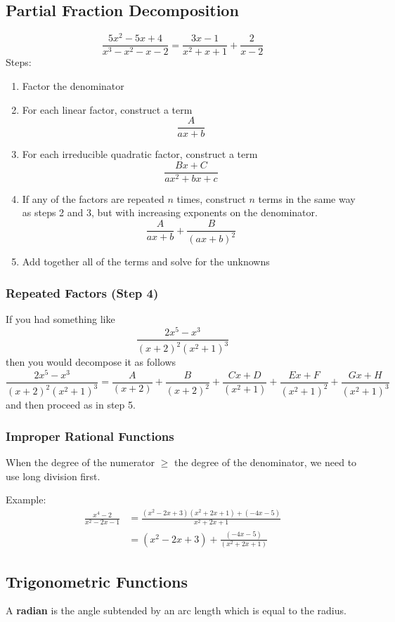 \documentclass[12pt]{article}
\begin{document}
\subsection*{Partial Fraction Decomposition}
\[ \frac{5x^2-5x+4}{x^3-x^2-x-2} = \frac{3x-1}{x^2+x+1} + \frac{2}{x-2} \]
Steps:
\begin{enumerate}
\item Factor the denominator
\item For each linear factor, construct a term \[ \frac{A}{ax+b} \]
\item For each irreducible quadratic factor, construct a term \[ \frac{Bx+C}{ax^2+bx+c} \]
\item If any of the factors are repeated $n$ times, construct $n$ terms in the same way as steps 2 and 3, but with increasing exponents on the denominator. \[ \frac{A}{ax+b} + \frac{B}{(ax+b)^2} \]
\item Add together all of the terms and solve for the unknowns
\end{enumerate}

\subsubsection*{Repeated Factors (Step 4)}
If you had something like \[ \frac{2x^5-x^3}{(x+2)^2(x^2+1)^3} \] then you would decompose it as follows \[ \frac{2x^5-x^3}{(x+2)^2(x^2+1)^3} = \frac{A}{(x+2)}+\frac{B}{(x+2)^2}+\frac{Cx+D}{(x^2+1)}+\frac{Ex+F}{(x^2+1)^2}+\frac{Gx+H}{(x^2+1)^3} \] and then proceed as in step 5.

\subsubsection*{Improper Rational Functions}
When the degree of the numerator $\geq$ the degree of the denominator, we need to use long division first.

Example:
\begin{align*}
\frac{x^4-2}{x^2-2x-1} &= \frac{(x^2-2x+3)(x^2+2x+1)+(-4x-5)}{x^2+2x+1}\\
&= (x^2-2x+3) + \frac{(-4x-5)}{(x^2+2x+1)}
\end{align*}

\subsection*{Trigonometric Functions}
A {\bf radian} is the angle subtended by an arc length which is equal to the radius.
\end{document}
